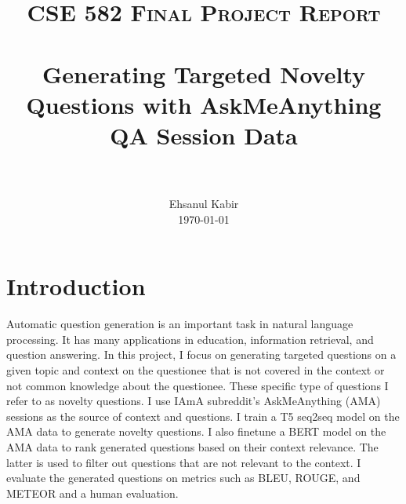 \documentclass[paper=a4, fontsize=11pt]{scrartcl}
\title{
		\usefont{OT1}{bch}{b}{n}
		\normalfont \normalsize \textsc{CSE 582 Final Project Report} \\ [25pt]
		\horrule{0.5pt} \\[0.4cm]
		\huge Generating Targeted Novelty Questions with AskMeAnything QA Session Data \\
		\horrule{2pt} \\[0.5cm]
}
\author{
		\normalfont 								\normalsize
        Ehsanul Kabir\\[-3pt]		\normalsize
        \today
}
\date{}
\numberwithin{equation}{section}		%
\numberwithin{figure}{section}			%
\numberwithin{table}{section}				%
\begin{document}
\maketitle
\section{Introduction}
Automatic question generation is an important task in natural language processing. 
It has many applications in education, information retrieval, and question answering. 
In this project, I focus on generating targeted questions on a given topic and context on the questionee that is not covered in the context or not common knowledge about the questionee.
These specific type of questions I refer to as novelty questions.
I use IAmA subreddit's AskMeAnything (AMA) sessions as the source of context and questions.
I train a T5 seq2seq model on the AMA data to generate novelty questions.
I also finetune a BERT model on the AMA data to rank generated questions based on their context relevance.
The latter is used to filter out questions that are not relevant to the context.
I evaluate the generated questions on metrics such as BLEU, ROUGE, and METEOR and a human evaluation.
\end{document}
